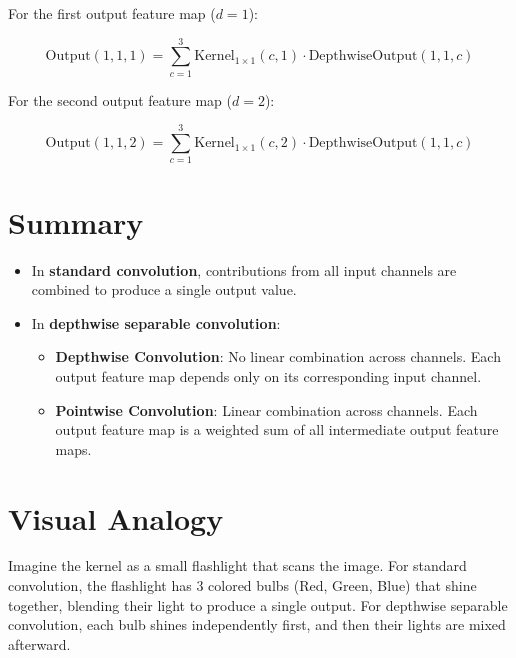 \begin{notechapter}
For the first output feature map (\(d = 1\)):

\[
\text{Output}(1, 1, 1) = \sum_{c=1}^{3} \text{Kernel}_{1 \times 1}(c, 1) 
\cdot \text{DepthwiseOutput}(1, 1, c)
\]

For the second output feature map (\(d = 2\)):

\[
\text{Output}(1, 1, 2) = \sum_{c=1}^{3} \text{Kernel}_{1 \times 1}(c, 2) 
\cdot \text{DepthwiseOutput}(1, 1, c)
\]

\section{Summary}

\begin{itemize}
    \item In \textbf{standard convolution}, contributions from all 
    input channels are combined to produce a single output value.
    \item In \textbf{depthwise separable convolution}:
    \begin{itemize}
        \item \textbf{Depthwise Convolution}: No linear combination 
        across channels. Each output feature map depends only on its 
        corresponding input channel.
        \item \textbf{Pointwise Convolution}: Linear combination 
        across channels. Each output feature map is a weighted sum 
        of all intermediate output feature maps.
    \end{itemize}
\end{itemize}

\section{Visual Analogy}

Imagine the kernel as a small flashlight that scans the image. For 
standard convolution, the flashlight has 3 colored bulbs (Red, Green, 
Blue) that shine together, blending their light to produce a single 
output. For depthwise separable convolution, each bulb shines 
independently first, and then their lights are mixed afterward.
\end{notechapter}

